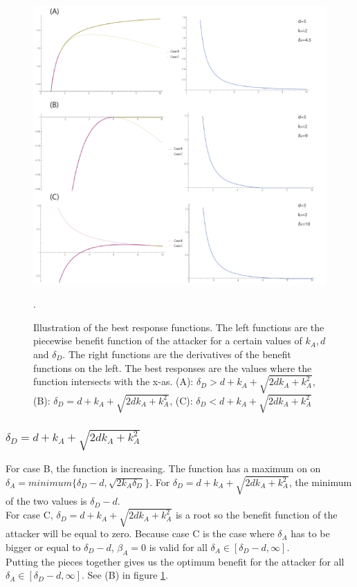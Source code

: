 \begin{figure}[hbtp]
\centering
\includegraphics[scale=1]{Images/case1A.pdf}
\caption{ Illustration of the best response functions. The left functions are the piecewise benefit function of the attacker for a certain values of $k_{A},d$ and $\delta_{D}$. The right functions are the derivatives of the benefit functions on the left. The best responses are the values where the function intersects with the x-as. (A): $\delta_{D} > d+k_{A} + \sqrt{2dk_{A}+k_{A}^{2}}$, (B): $\delta_{D} = d+k_{A} + \sqrt{2dk_{A}+k_{A}^{2}}$, (C): $\delta_{D} < d+k_{A} + \sqrt{2dk_{A}+k_{A}^{2}}$}.
\label{case1A}
\end{figure}

\subsubsection*{$\delta_{D} = d+k_{A} + \sqrt{2dk_{A}+k_{A}^{2}}$} 
For case B, the function is increasing. The function has a maximum on on $\delta_{A} = minimum \{\delta_{D} -d, \sqrt{2k_{A}\delta_{D}} \} $. For $\delta_{D} = d+k_{A} + \sqrt{2dk_{A}+k_{A}^{2}}$, the minimum of the two values is $\delta_{D}-d$.\\
For case C, $\delta_{D} = d+k_{A} + \sqrt{2dk_{A}+k_{A}^{2}}$ is a root so the benefit function of the attacker will be equal to zero. Because case C is the case where $\delta_{A}$ has to be bigger or equal to $\delta_{D}-d$, $\beta_{A}=0$ is valid for all $\delta_{A} \in [\delta_{D}-d,\infty]$.\\
Putting the pieces together gives us the optimum benefit for the attacker for all $\delta_{A} \in [\delta_{D}-d,\infty]$. See (B) in figure \ref{case1A}.

